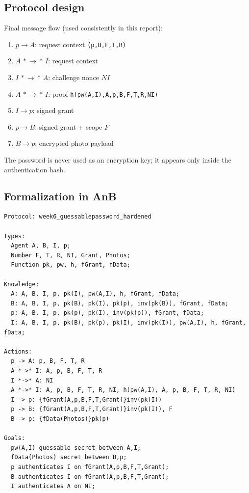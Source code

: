 \documentclass[11pt,a4paper]{article}
\begin{document}
\subsection{Protocol design}
Final message flow (used consistently in this report):
\begin{enumerate}[leftmargin=1.4em]
  \item $p \rightarrow A$: request context \texttt{(p,B,F,T,R)}
  \item $A \,*\!\rightarrow\!*\, I$: request context
  \item $I \,*\!\rightarrow\!*\, A$: challenge nonce $NI$
  \item $A \,*\!\rightarrow\!*\, I$: proof \texttt{h(pw(A,I),A,p,B,F,T,R,NI)}
  \item $I \rightarrow p$: signed grant
  \item $p \rightarrow B$: signed grant + scope $F$
  \item $B \rightarrow p$: encrypted photo payload
\end{enumerate}

The password is never used as an encryption key; it appears only inside the authentication hash.

\subsection{Formalization in AnB}
\begin{lstlisting}
Protocol: week6_guessablepassword_hardened

Types:
  Agent A, B, I, p;
  Number F, T, R, NI, Grant, Photos;
  Function pk, pw, h, fGrant, fData;

Knowledge:
  A: A, B, I, p, pk(I), pw(A,I), h, fGrant, fData;
  B: A, B, I, p, pk(B), pk(I), pk(p), inv(pk(B)), fGrant, fData;
  p: A, B, I, p, pk(p), pk(I), inv(pk(p)), fGrant, fData;
  I: A, B, I, p, pk(B), pk(p), pk(I), inv(pk(I)), pw(A,I), h, fGrant, fData;

Actions:
  p -> A: p, B, F, T, R
  A *->* I: A, p, B, F, T, R
  I *->* A: NI
  A *->* I: A, p, B, F, T, R, NI, h(pw(A,I), A, p, B, F, T, R, NI)
  I -> p: {fGrant(A,p,B,F,T,Grant)}inv(pk(I))
  p -> B: {fGrant(A,p,B,F,T,Grant)}inv(pk(I)), F
  B -> p: {fData(Photos)}pk(p)

Goals:
  pw(A,I) guessable secret between A,I;
  fData(Photos) secret between B,p;
  p authenticates I on fGrant(A,p,B,F,T,Grant);
  B authenticates I on fGrant(A,p,B,F,T,Grant);
  I authenticates A on NI;
\end{lstlisting}
\end{document}
